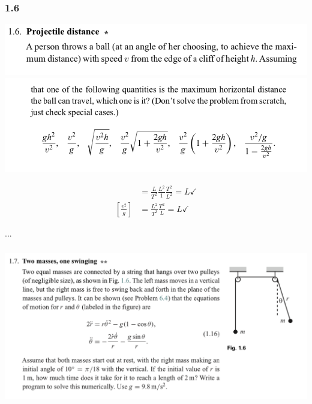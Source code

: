 \subsubsection*{1.6}
\begin{mdframed}
  \includegraphics[width=400pt]{img/physics--classical-mechanics--morin--1-6-1.png}\\
  \includegraphics[width=400pt]{img/physics--classical-mechanics--morin--1-6-2.png}
\end{mdframed}

\begin{align*}
  [\frac{gh^2}{v^2}] &= \frac{L}{T^2} \frac{L^2}{1} \frac{T^2}{L^2} = L \checkmark \\
  [\frac{v^2}{g}]    &= \frac{L^2}{T^2} \frac{T^2}{L} = L \checkmark
\end{align*}

...

\subsubsection*{}
\begin{mdframed}
  \includegraphics[width=400pt]{img/physics--classical-mechanics--morin--1-7.png}
\end{mdframed}


